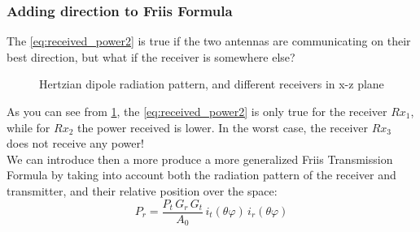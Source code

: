 \subsubsection*{Adding direction to Friis Formula}
The \cref{eq:received_power2} is true if the two antennas are communicating on their best direction, but what if the receiver is somewhere else?
\begin{figure}[H]
    \begin{center}
        \caption{Hertzian dipole radiation pattern, and different receivers in x-z plane}\label{fig:Dipolexz_diff_rec_pos}
    \end{center}
\end{figure}
As you can see from \cref{fig:Dipolexz_diff_rec_pos}, the \cref{eq:received_power2} is only true for the receiver $Rx_1$, while for $Rx_2$ the power received is lower. In the worst case, the receiver $Rx_3$ does not receive any power!\\
We can introduce then a more produce a more generalized Friis Transmission Formula by taking into account both the radiation pattern of the receiver and transmitter, and their relative position over the space:
\begin{equation}
    P_r=\frac{P_t\,G_r\,G_t}{A_0}\,i_t(\theta\varphi)\,i_r(\theta\varphi)
\end{equation}
